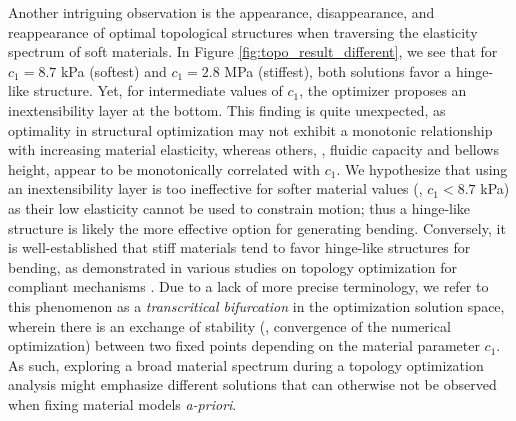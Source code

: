 Another intriguing observation is the appearance, disappearance, and reappearance of optimal topological structures when traversing the elasticity spectrum of soft materials. In Figure \ref{fig:topo_result_different}, we see that for $c_1 = 8.7$ kPa (softest) and $c_1 = 2.8$ MPa (stiffest), both solutions favor a hinge-like structure. Yet, for intermediate values of $c_1$, the optimizer proposes an inextensibility layer at the bottom. This finding is quite unexpected, as optimality in structural optimization may not exhibit a monotonic relationship with increasing material elasticity, whereas others, \eg, fluidic capacity and bellows height, appear to be monotonically correlated with $c_1$. We hypothesize that using an inextensibility layer is too ineffective for softer material values (\ie, $c_1 < 8.7$ kPa) as their low elasticity cannot be used to constrain motion; thus a hinge-like structure is likely the more effective option for generating bending. Conversely, it is well-established that stiff materials tend to favor hinge-like structures for bending, as demonstrated in various studies on topology optimization for compliant mechanisms \cite{Bendsoe2003, Zhang2017Topo, Luo2016Mar}. Due to a lack of more precise terminology, we refer to this phenomenon as a \textit{transcritical bifurcation} in the optimization solution space, wherein there is an exchange of stability (\ie, convergence of the numerical optimization) between two fixed points depending on the material parameter $c_1$. As such, exploring a broad material spectrum during a topology optimization analysis might emphasize different solutions that can otherwise not be observed when fixing material models \textit{a-priori}.
